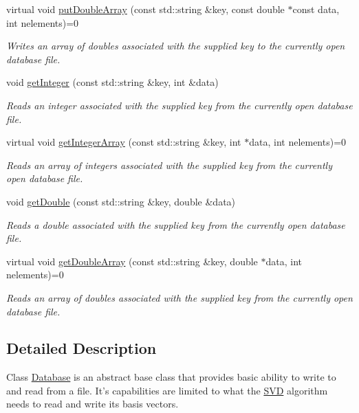 \begin{DoxyCompactItemize}
virtual void \hyperlink{class_c_a_r_o_m_1_1_database_ae85e8cc70193d2802eb73db94fa54975}{put\-Double\-Array} (const std\-::string \&key, const double $\ast$const data, int nelements)=0
\begin{DoxyCompactList}\small\item\em Writes an array of doubles associated with the supplied key to the currently open database file. \end{DoxyCompactList}\item 
void \hyperlink{class_c_a_r_o_m_1_1_database_a5734113f2bec0450fc014f84abdc41c4}{get\-Integer} (const std\-::string \&key, int \&data)
\begin{DoxyCompactList}\small\item\em Reads an integer associated with the supplied key from the currently open database file. \end{DoxyCompactList}\item 
virtual void \hyperlink{class_c_a_r_o_m_1_1_database_a7a518cc3a2b49fbfe70b45030319741d}{get\-Integer\-Array} (const std\-::string \&key, int $\ast$data, int nelements)=0
\begin{DoxyCompactList}\small\item\em Reads an array of integers associated with the supplied key from the currently open database file. \end{DoxyCompactList}\item 
void \hyperlink{class_c_a_r_o_m_1_1_database_aee76ac7276135e202f0d5d6a6adce034}{get\-Double} (const std\-::string \&key, double \&data)
\begin{DoxyCompactList}\small\item\em Reads a double associated with the supplied key from the currently open database file. \end{DoxyCompactList}\item 
virtual void \hyperlink{class_c_a_r_o_m_1_1_database_ab5775af8c9f41f00c4bd8d23227f1b8d}{get\-Double\-Array} (const std\-::string \&key, double $\ast$data, int nelements)=0
\begin{DoxyCompactList}\small\item\em Reads an array of doubles associated with the supplied key from the currently open database file. \end{DoxyCompactList}\end{DoxyCompactItemize}


\subsection{Detailed Description}
Class \hyperlink{class_c_a_r_o_m_1_1_database}{Database} is an abstract base class that provides basic ability to write to and read from a file. It's capabilities are limited to what the \hyperlink{class_c_a_r_o_m_1_1_s_v_d}{S\-V\-D} algorithm needs to read and write its basis vectors. 

